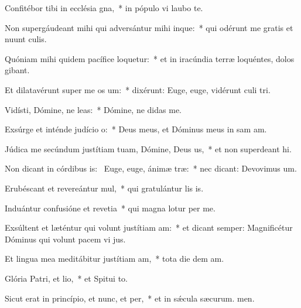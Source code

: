 \item Confitébor tibi in ecclésia gna,~* in pópulo vi laubo te.
\item Non supergáudeant mihi qui adversántur mihi inque:~* qui odérunt me gratis et nuunt culis.
\item Quóniam mihi quidem pacífice loquetur:~* et in iracúndia terræ loquéntes, dolos gibant.
\item Et dilatavérunt super me os um:~* dixérunt: Euge, euge, vidérunt culi tri.
\item Vidísti, Dómine, ne leas:~* Dómine, ne didas  me.
\item Exsúrge et inténde judício o:~* Deus meus, et Dóminus meus in sam am.
\item Júdica me secúndum justítiam tuam, Dómine, Deus us,~* et non superdeant hi.
\item Non dicant in córdibus is:~\pscross{} Euge, euge, ánimæ træ:~* nec dicant: Devovimus um.
\item Erubéscant et revereántur mul,~* qui gratulántur lis is.
\item Induántur confusióne et revetia~* qui magna lotur per me.
\item Exsúltent et læténtur qui volunt justítiam am:~* et dicant semper: Magnificétur Dóminus qui volunt pacem vi jus.
\item Et lingua mea meditábitur justítiam am,~* tota die dem am.
\item Glória Patri, et lio,~* et Spitui to.
\item Sicut erat in princípio, et nunc, et per,~* et in sǽcula sæcurum. men.
